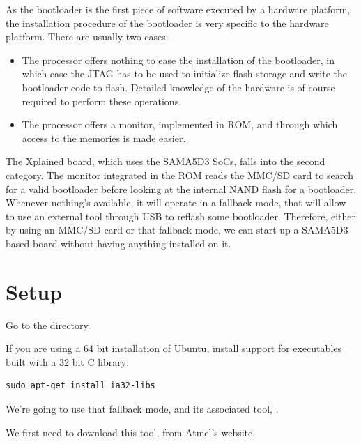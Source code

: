 
As the bootloader is the first piece of software executed by a
hardware platform, the installation procedure of the bootloader is
very specific to the hardware platform. There are usually two cases:

\begin{itemize}

\item The processor offers nothing to ease the installation of the
  bootloader, in which case the JTAG has to be used to initialize
  flash storage and write the bootloader code to flash. Detailed
  knowledge of the hardware is of course required to perform these
  operations.

\item The processor offers a monitor, implemented in ROM, and through
  which access to the memories is made easier.

\end{itemize}

The Xplained board, which uses the SAMA5D3 SoCs, falls into the second
category. The monitor integrated in the ROM reads the MMC/SD card to
search for a valid bootloader before looking at the internal NAND
flash for a bootloader. Whenever nothing's available, it will operate
in a fallback mode, that will allow to use an external tool through
USB to reflash some bootloader. Therefore, either by using an MMC/SD
card or that fallback mode, we can start up a SAMA5D3-based board
without having anything installed on it.

\section{Setup}

Go to the  directory.

If you are using a 64 bit installation of Ubuntu, install support for
executables built with a 32 bit C library:

\begin{verbatim}
sudo apt-get install ia32-libs
\end{verbatim}

We're going to use that fallback mode, and its associated tool,
.

We first need to download this tool, from Atmel's website.

